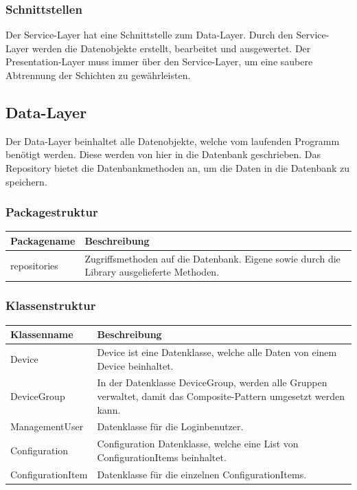 \subsubsection{Schnittstellen}
Der Service-Layer hat eine Schnittstelle zum Data-Layer. Durch den Service-Layer werden die Datenobjekte erstellt, bearbeitet und ausgewertet. Der Presentation-Layer muss immer über den Service-Layer, um eine saubere Abtrennung der Schichten zu gewährleisten.

\newpage

\subsection{Data-Layer}
Der Data-Layer beinhaltet alle Datenobjekte, welche vom laufenden Programm benötigt werden. Diese werden von hier in die Datenbank geschrieben. Das Repository bietet die Datenbankmethoden an, um die Daten in die Datenbank zu speichern.

\subsubsection{Packagestruktur}
\begin{table}[H]
\centering
    \begin{tabular}{@{}l p{14.1cm} @{}}\toprule    
    {Packagename} & {Beschreibung}\\ \midrule
    repositories & Zugriffsmethoden auf die Datenbank. Eigene sowie durch die Library ausgelieferte Methoden. \\       
    \bottomrule
    \end{tabular}
\end{table}

\subsubsection{Klassenstruktur}
\begin{table}[H]
\centering
    \begin{tabular}{@{}l p{14.1cm} @{}}\toprule    
    {Klassenname} & {Beschreibung}\\ \midrule
    Device & Device ist eine Datenklasse, welche alle Daten von einem Device beinhaltet.\\
    DeviceGroup & In der Datenklasse DeviceGroup, werden alle Gruppen verwaltet, damit das Composite-Pattern umgesetzt werden kann.\\
    ManagementUser & Datenklasse für die Loginbenutzer.\\
    Configuration & Configuration Datenklasse, welche eine List von ConfigurationItems beinhaltet. \\
    ConfigurationItem & Datenklasse für die einzelnen ConfigurationItems.\\
    \bottomrule
    \end{tabular}
\end{table}
